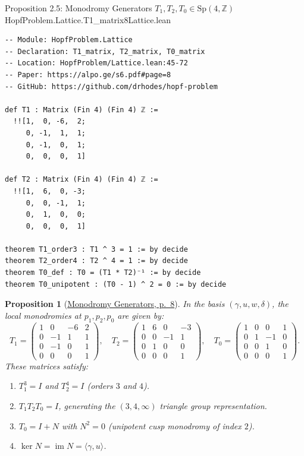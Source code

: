 \documentclass[10pt]{article}
\newtheorem{proposition}[theorem]{Proposition}
\newcommand{\dbZ}{\mathbb{Z}}
\newcommand{\Sp}{\mathrm{Sp}}
\newcommand{\im}{\operatorname{im}}
\gdef\hashchar{#}
\newcommand{\paperref}[2]{\href{https://alpo.ge/s6.pdf\hashchar page=#1}{#2}}
\begin{document}
\begin{comparativeblock}{Proposition 2.5: Monodromy Generators $T_1, T_2, T_0 \in \Sp(4,\dbZ)$}{HopfProblem.Lattice.T1_matrix}{8}{Lattice.lean}
\begin{verbatim}
-- Module: HopfProblem.Lattice
-- Declaration: T1_matrix, T2_matrix, T0_matrix
-- Location: HopfProblem/Lattice.lean:45-72
-- Paper: https://alpo.ge/s6.pdf#page=8
-- GitHub: https://github.com/drhodes/hopf-problem

def T1 : Matrix (Fin 4) (Fin 4) ℤ :=
  !![1,  0, -6,  2;
     0, -1,  1,  1;
     0, -1,  0,  1;
     0,  0,  0,  1]

def T2 : Matrix (Fin 4) (Fin 4) ℤ :=
  !![1,  6,  0, -3;
     0,  0, -1,  1;
     0,  1,  0,  0;
     0,  0,  0,  1]

theorem T1_order3 : T1 ^ 3 = 1 := by decide
theorem T2_order4 : T2 ^ 4 = 1 := by decide
theorem T0_def : T0 = (T1 * T2)⁻¹ := by decide
theorem T0_unipotent : (T0 - 1) ^ 2 = 0 := by decide
\end{verbatim}
\tcblower
\begin{proposition}[\paperref{8}{Monodromy Generators, p.~8}]\label{prop:monodromy-gen}
In the basis $(\gamma, u, w, \delta)$, the local monodromies at $p_1, p_2, p_0$ are given by:
\[
T_1 = \begin{pmatrix} 1 & 0 & -6 & 2 \\ 0 & -1 & 1 & 1 \\ 0 & -1 & 0 & 1 \\ 0 & 0 & 0 & 1 \end{pmatrix}, \quad
T_2 = \begin{pmatrix} 1 & 6 & 0 & -3 \\ 0 & 0 & -1 & 1 \\ 0 & 1 & 0 & 0 \\ 0 & 0 & 0 & 1 \end{pmatrix}, \quad
T_0 = \begin{pmatrix} 1 & 0 & 0 & 1 \\ 0 & 1 & -1 & 0 \\ 0 & 0 & 1 & 0 \\ 0 & 0 & 0 & 1 \end{pmatrix}.
\]
These matrices satisfy:
\begin{enumerate}[label=(\roman*), itemsep=1pt, parsep=0pt]
    \item $T_1^3 = I$ and $T_2^4 = I$ (orders $3$ and $4$).
    \item $T_1 T_2 T_0 = I$, generating the $(3,4,\infty)$ triangle group representation.
    \item $T_0 = I + N$ with $N^2 = 0$ (unipotent cusp monodromy of index $2$).
    \item $\ker N = \im N = \langle \gamma, u \rangle$.
\end{enumerate}
\end{proposition}
\end{comparativeblock}
\end{document}
